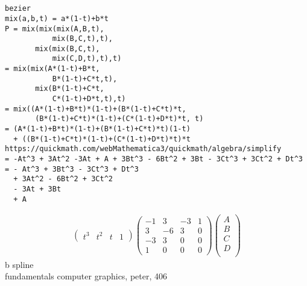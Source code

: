 \documentclass[12pt, border = 4pt, multi]{article} %
\begin{document}
\section*{}
\begin{verbatim}
bezier
mix(a,b,t) = a*(1-t)+b*t
P = mix(mix(mix(A,B,t),
           mix(B,C,t),t),
       mix(mix(B,C,t),
           mix(C,D,t),t),t)
= mix(mix(A*(1-t)+B*t,
           B*(1-t)+C*t,t),
       mix(B*(1-t)+C*t,
           C*(1-t)+D*t,t),t)
= mix((A*(1-t)+B*t)*(1-t)+(B*(1-t)+C*t)*t,
       (B*(1-t)+C*t)*(1-t)+(C*(1-t)+D*t)*t, t)
= (A*(1-t)+B*t)*(1-t)+(B*(1-t)+C*t)*t)(1-t)
  + ((B*(1-t)+C*t)*(1-t)+(C*(1-t)+D*t)*t)*t
https://quickmath.com/webMathematica3/quickmath/algebra/simplify
= -At^3 + 3At^2 -3At + A + 3Bt^3 - 6Bt^2 + 3Bt - 3Ct^3 + 3Ct^2 + Dt^3
= - At^3 + 3Bt^3 - 3Ct^3 + Dt^3
  + 3At^2 - 6Bt^2 + 3Ct^2
  - 3At + 3Bt 
  + A
\end{verbatim}
\begin{align*}
\begin{pmatrix}
t ^ 3 & t ^ 2 & t & 1
\end{pmatrix}
\begin{pmatrix}
-1 & 3 & -3 & 1\\
3 & -6 & 3 & 0\\
-3 & 3 & 0 & 0\\ 
1 & 0 & 0 & 0
\end{pmatrix}
\begin{pmatrix}
A\\
B\\
C\\
D\\
\end{pmatrix}
\end{align*}
b spline\\
fundamentals computer graphics, peter, 406
\end{document}
